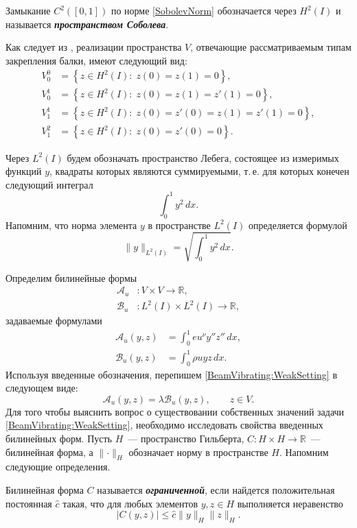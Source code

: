 %
%
%
\begin{definition}
Замыкание $C^2([0, 1])$ по норме
\eqref{SobolevNorm}
обозначается через $H^2(I)$ и называется \emph{\textbf{пространством Соболева}}.
\end{definition}
%
%
%
Как следует из
\cite{book:Fichera},
реализации пространства $V$,
отвечающие рассматриваемым типам закрепления балки,
имеют следующий вид:
\[
\begin{aligned}
V_0^0 &= \left\{
z \in H^2(I) : \;
z(0) = z(1) = 0
\right\},
\\
V_0^1 &= \left\{
z \in H^2(I) : \;
z(0) = z(1) = z'(1) = 0
\right\},
\\
V_1^1 &= \left\{
z \in H^2(I) : \;
z(0) = z'(0) = z(1) = z'(1) = 0
\right\},
\\
V_1^2 &= \left\{
z \in H^2(I) : \;
z(0) = z'(0) = 0
\right\}.
\end{aligned}
\]
%
%
%
\par
Через $L^2(I)$ будем обозначать пространство Лебега, состоящее из измеримых функций $y$,
квадраты которых являются суммируемыми,
т.\,е.
для которых
конечен следующий интеграл
\[
\int_0^1 y^2 \, dx.
\]
Напомним,
что норма элемента $y$ в пространстве $L^2(I)$
определяется формулой
\[
\lVert y \rVert_{L^2(I)} = \sqrt{\int_0^1 y^2 \, dx}.
\]
%
%
%
\par
Определим билинейные формы 
\[
\begin{aligned}
\mathcal{A}_u &: V \times V \to \mathbb{R},
\\
\mathcal{B}_u &: L^2(I) \times L^2(I) \to \mathbb{R},
\end{aligned}
\]
задаваемые формулами
\[
\begin{aligned}
\mathcal{A}_u(y, z) &= \int_0^1 eu^\nu y'' z'' \, dx,
\\
\mathcal{B}_u(y, z) &= \int_0^1 \rho u y z \, dx.
\end{aligned}
\]
%
%
%
Используя введенные обозначения,
перепишем
\eqref{BeamVibrating:WeakSetting}
в следующем виде:
\[
\mathcal{A}_u(y, z) = \lambda \mathcal{B}_u(y, z),
\qquad
z \in V.
\]
%
%
%
Для того чтобы выяснить вопрос о существовании собственных значений задачи \eqref{BeamVibrating:WeakSetting},
необходимо исследовать свойства введенных билинейных форм.
%
%
%
Пусть $H$~--- пространство Гильберта, $C : H \times H \to \mathbb{R}$~--- билинейная форма,
а
$\lVert \cdot \rVert_H$ обозначает норму в пространстве $H$.
%
%
%
Напомним следующие определения.
%
%
%
\begin{definition}
Билинейная форма $C$ называется \emph{\textbf{ограниченной}},
если найдется положительная постоянная $\hat{c}$
такая, что
для любых элементов $y, z \in H$ выполняется неравенство
\[
|C(y, z)|
\leq
\hat{c} \lVert y \rVert_H \lVert z \rVert_H.
\]
\end{definition}
